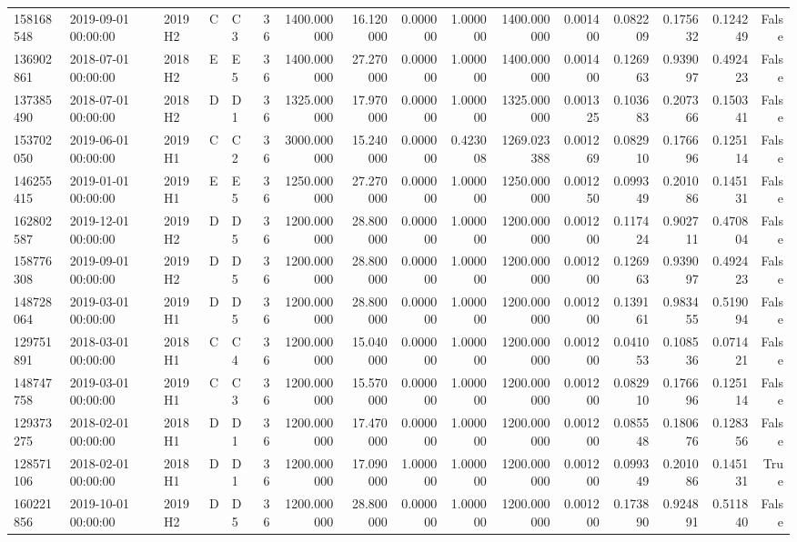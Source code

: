\begin{tabular}{lllllrrrrrrrrrrr}
158168548 & 2019-09-01 00:00:00 & 2019H2 & C & C3 & 36 & 1400.000000 & 16.120000 & 0.000000 & 1.000000 & 1400.000000 & 0.001400 & 0.082209 & 0.175632 & 0.124249 & False \\
136902861 & 2018-07-01 00:00:00 & 2018H2 & E & E5 & 36 & 1400.000000 & 27.270000 & 0.000000 & 1.000000 & 1400.000000 & 0.001400 & 0.126963 & 0.939097 & 0.492423 & False \\
137385490 & 2018-07-01 00:00:00 & 2018H2 & D & D1 & 36 & 1325.000000 & 17.970000 & 0.000000 & 1.000000 & 1325.000000 & 0.001325 & 0.103683 & 0.207366 & 0.150341 & False \\
153702050 & 2019-06-01 00:00:00 & 2019H1 & C & C2 & 36 & 3000.000000 & 15.240000 & 0.000000 & 0.423008 & 1269.023388 & 0.001269 & 0.082910 & 0.176696 & 0.125114 & False \\
146255415 & 2019-01-01 00:00:00 & 2019H1 & E & E5 & 36 & 1250.000000 & 27.270000 & 0.000000 & 1.000000 & 1250.000000 & 0.001250 & 0.099349 & 0.201086 & 0.145131 & False \\
162802587 & 2019-12-01 00:00:00 & 2019H2 & D & D5 & 36 & 1200.000000 & 28.800000 & 0.000000 & 1.000000 & 1200.000000 & 0.001200 & 0.117424 & 0.902711 & 0.470804 & False \\
158776308 & 2019-09-01 00:00:00 & 2019H2 & D & D5 & 36 & 1200.000000 & 28.800000 & 0.000000 & 1.000000 & 1200.000000 & 0.001200 & 0.126963 & 0.939097 & 0.492423 & False \\
148728064 & 2019-03-01 00:00:00 & 2019H1 & D & D5 & 36 & 1200.000000 & 28.800000 & 0.000000 & 1.000000 & 1200.000000 & 0.001200 & 0.139161 & 0.983455 & 0.519094 & False \\
129751891 & 2018-03-01 00:00:00 & 2018H1 & C & C4 & 36 & 1200.000000 & 15.040000 & 0.000000 & 1.000000 & 1200.000000 & 0.001200 & 0.041053 & 0.108536 & 0.071421 & False \\
148747758 & 2019-03-01 00:00:00 & 2019H1 & C & C3 & 36 & 1200.000000 & 15.570000 & 0.000000 & 1.000000 & 1200.000000 & 0.001200 & 0.082910 & 0.176696 & 0.125114 & False \\
129373275 & 2018-02-01 00:00:00 & 2018H1 & D & D1 & 36 & 1200.000000 & 17.470000 & 0.000000 & 1.000000 & 1200.000000 & 0.001200 & 0.085548 & 0.180676 & 0.128356 & False \\
128571106 & 2018-02-01 00:00:00 & 2018H1 & D & D1 & 36 & 1200.000000 & 17.090000 & 1.000000 & 1.000000 & 1200.000000 & 0.001200 & 0.099349 & 0.201086 & 0.145131 & True \\
160221856 & 2019-10-01 00:00:00 & 2019H2 & D & D5 & 36 & 1200.000000 & 28.800000 & 0.000000 & 1.000000 & 1200.000000 & 0.001200 & 0.173890 & 0.924891 & 0.511840 & False \\

\end{tabular}
